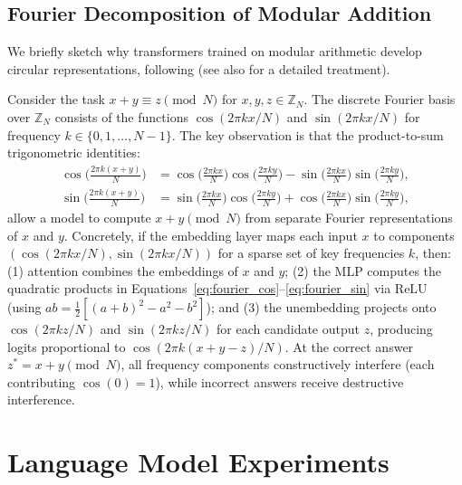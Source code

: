 \documentclass{article} %
\begin{document}
\subsection{Fourier Decomposition of Modular Addition}
\label{apndx_fourier}

We briefly sketch why transformers trained on modular arithmetic develop circular representations, following \citet{nanda2023progress} (see also \citet{zhong2024clock} for a detailed treatment).

Consider the task $x + y \equiv z \pmod{N}$ for $x, y, z \in \mathbb{Z}_N$. The discrete Fourier basis over $\mathbb{Z}_N$ consists of the functions $\cos(2\pi k x / N)$ and $\sin(2\pi k x / N)$ for frequency $k \in \{0, 1, \ldots, N-1\}$. The key observation is that the product-to-sum trigonometric identities:
\begin{align}
\cos\!\Big(\frac{2\pi k (x+y)}{N}\Big) &= \cos\!\Big(\frac{2\pi k x}{N}\Big)\cos\!\Big(\frac{2\pi k y}{N}\Big) - \sin\!\Big(\frac{2\pi k x}{N}\Big)\sin\!\Big(\frac{2\pi k y}{N}\Big), \label{eq:fourier_cos} \\
\sin\!\Big(\frac{2\pi k (x+y)}{N}\Big) &= \sin\!\Big(\frac{2\pi k x}{N}\Big)\cos\!\Big(\frac{2\pi k y}{N}\Big) + \cos\!\Big(\frac{2\pi k x}{N}\Big)\sin\!\Big(\frac{2\pi k y}{N}\Big), \label{eq:fourier_sin}
\end{align}
allow a model to compute $x + y \pmod{N}$ from separate Fourier representations of $x$ and $y$. Concretely, if the embedding layer maps each input $x$ to components $(\cos(2\pi k x / N), \sin(2\pi k x / N))$ for a sparse set of key frequencies $k$, then: (1) attention combines the embeddings of $x$ and $y$; (2) the MLP computes the quadratic products in Equations~\ref{eq:fourier_cos}--\ref{eq:fourier_sin} via $\text{ReLU}$ (using $ab = \frac{1}{2}[(a+b)^2 - a^2 - b^2]$); and (3) the unembedding projects onto $\cos(2\pi k z / N)$ and $\sin(2\pi k z / N)$ for each candidate output $z$, producing logits proportional to $\cos(2\pi k (x+y-z) / N)$. At the correct answer $z^* = x + y \pmod{N}$, all frequency components constructively interfere (each contributing $\cos(0) = 1$), while incorrect answers receive destructive interference.

\section{Language Model Experiments}
\label{apndx_lm}
\end{document}
